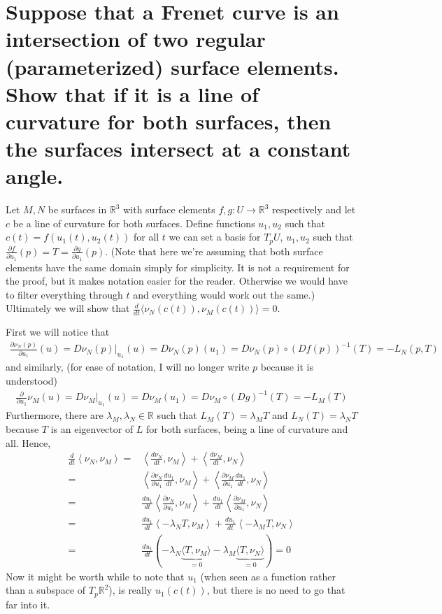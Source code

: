 \documentclass[12pt]{amsart}
\begin{document}
\newpage
\section{Suppose that a Frenet curve is an intersection of two regular (parameterized) surface elements. Show that if it is a line of curvature for both surfaces, then the surfaces intersect at a constant angle.}
\begin{comment}
	page 277
\end{comment}
Let $M,N$ be surfaces in $\mathbb{R}^3$ with surface elements $f,g:U\to\mathbb{R}^3$ respectively and let $c$ be a line of curvature for both surfaces. Define functions $u_1,u_2$ such that $c(t)=f(u_1(t),u_2(t))$ for all $t$ we can set a basis for $T_{p}U$, $u_1,u_2$ such that $\frac{\partial f}{\partial u_1}(p)=T=\frac{\partial g}{\partial u_1}(p)$. (Note that here we're assuming that both surface elements have the same domain simply for simplicity. It is not a requirement for the proof, but it makes notation easier for the reader. Otherwise we would have to filter everything through $t$ and everything would work out the same.) Ultimately we will show that $\frac{d}{dt}\langle \nu_N(c(t)),\nu_M(c(t))\rangle=0$.

First we will notice that 
\begin{align*}
	\frac{\partial\nu_N(p)}{\partial u_1}(u)=D\nu_N(p)\big|_{u_1}(u)=D\nu_N(p)(u_1)=D\nu_N(p)\circ\left(Df(p)\right)^{-1}(T)=-L_N(p,T)
\end{align*} and similarly, (for ease of notation, I will no longer write $p$ because it is understood)
\begin{align*}
	\frac{\partial}{\partial u_1}\nu_M(u)=D\nu_M\big|_{u_1}(u)=D\nu_M(u_1)=D\nu_M\circ\left(Dg\right)^{-1}(T)=-L_M(T)
\end{align*}
Furthermore, there are $\lambda_M,\lambda_N\in\mathbb{R}$ such that $L_M(T)=\lambda_MT$ and $L_N(T)=\lambda_NT$ because $T$ is an eigenvector of $L$ for both surfaces, being a line of curvature and all. Hence,
\begin{align*}
	\frac{d}{dt}\left\langle\nu_N,\nu_M\right\rangle=&\left\langle\frac{d\nu_N}{dt},\nu_M\right\rangle+\left\langle\frac{d\nu_M}{dt},\nu_N\right\rangle
	\\=&\left\langle\frac{\partial\nu_N}{\partial u_1}\frac{du_1}{dt},\nu_M\right\rangle+\left\langle\frac{\partial\nu_M}{\partial u_1}\frac{du_1}{dt},\nu_N\right\rangle
	\\=&\frac{du_1}{dt}\left\langle\frac{\partial\nu_N}{\partial u_1},\nu_M\right\rangle+\frac{du_1}{dt}\left\langle\frac{\partial\nu_M}{\partial u_1},\nu_N\right\rangle
	\\=&\frac{du_1}{dt}\left\langle-\lambda_NT,\nu_M\right\rangle+\frac{du_1}{dt}\left\langle-\lambda_MT,\nu_N\right\rangle
	\\=&\frac{du_1}{dt}\left(-\lambda_N\underbrace{\langle T,\nu_M\rangle}_{=0}-\lambda_M\underbrace{\langle T,\nu_N\rangle}_{=0}\right)=0
\end{align*} Now it might be worth while to note that $u_1$ (when seen as a function rather than a subspace of $T_p\mathbb{R}^2$), is really $u_1(c(t))$, but there is no need to go that far into it.
\end{document}
